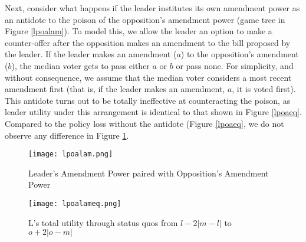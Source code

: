 \documentclass[12pt]{article}
\theoremstyle{plain}		      \newtheorem{assn}{Assumption}
\theoremstyle{plain}		      \newtheorem{prop}{Proposition}
\theoremstyle{plain}		      \newtheorem{lemma}{Lemma}
\theoremstyle{plain}	          \newtheorem{imp}{Implication}
\theoremstyle{plain}	          \newtheorem{hyp}{Hypothesis}
\theoremstyle{definition}		  \newtheorem{defn}{Definition}
\theoremstyle{remark}	          \newtheorem{rem}{Remark}
\theoremstyle{definition}         \newtheorem{case}{Case}
\begin{document}
\indent Next, consider what happens if the leader institutes its own amendment power as an antidote to the poison of the opposition's amendment power (game tree in Figure \ref{lpoalam}). To model this, we allow the leader an option to make a counter-offer after the opposition makes an amendment to the bill proposed by the leader. If the leader makes an amendment ($a$) to the opposition's amendment ($b$), the median voter gets to pass either $a$ or $b$ or pass none. For simplicity, and without consequence, we assume that the median voter considers a most recent amendment first (that is, if the leader makes an amendment, $a$, it is voted first). This antidote turns out to be totally ineffective at counteracting the poison, as leader utility under this arrangement is identical to that shown in Figure \ref{lpoaeq}. Compared to the policy loss without the antidote (Figure \ref{lpoaeq}, we do not observe any difference in Figure \ref{lpoalameq}.
\begin{figure}[h]
  \centering
  \begin{minipage}[b]{0.3\textwidth}
    \texttt{[image: lpoalam.png]}
    \caption{Leader's Amendment Power paired with Opposition's Amendment Power}
    \label{lpoalam}
  \end{minipage}
  \hfill
  \begin{minipage}[b]{0.6\textwidth}
    \texttt{[image: lpoalameq.png]}
    \caption{L's total utility through status quos \newline from $l-2|m-l|$ to $o+2|o-m|$}
    \label{lpoalameq}
  \end{minipage}
\end{figure}
\FloatBarrier
\end{document}
